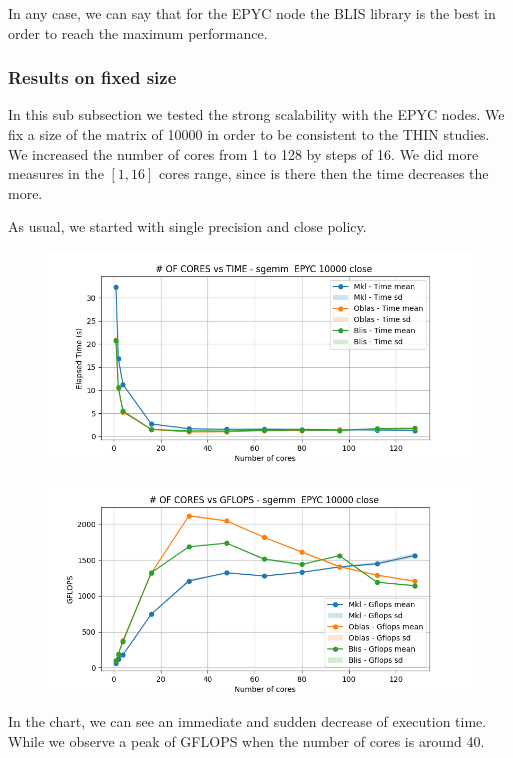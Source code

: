 \documentclass{article}
\begin{document}
In any case, we can say that for the EPYC node the BLIS library is the best in order to reach the maximum performance. 

\subsubsection{Results on fixed size}
In this sub subsection we tested the strong scalability with the EPYC nodes. We fix a size of the matrix of 10000 in order to be consistent to the THIN studies. We increased the number of cores from 1 to 128 by steps of 16. We did more measures in the $[1,16]$ cores range, since is there then the time decreases the more.  

As usual, we started with single precision and close policy. 
\begin{figure}[H]
    \centering
    \includegraphics[width=\textwidth]{EPYC scalability/sgemm__EPYC_10000_close_time.png}
\end{figure}

\begin{figure}[H]
    \centering
    \includegraphics[width=\textwidth]{EPYC scalability/sgemm__EPYC_10000_close_gflops.png}
\end{figure}
In the chart, we can see an immediate and sudden decrease of execution time. While we observe a peak of GFLOPS when the number of cores is around 40. 
\end{document}
